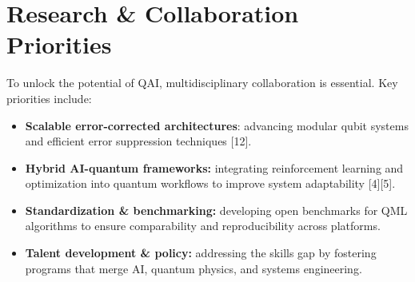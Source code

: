 \section{Research \& Collaboration Priorities}
\hspace*{0.3in}To unlock the potential of QAI, multidisciplinary collaboration is essential. Key priorities include:
\begin{itemize}
	\item \textbf{Scalable error-corrected architectures}: advancing modular qubit systems and efficient error suppression techniques [12].
	\item \textbf{Hybrid AI-quantum frameworks:} integrating reinforcement learning and optimization into quantum workflows to improve system adaptability [4][5].
	\item \textbf{Standardization \& benchmarking:} developing open benchmarks for QML algorithms to ensure comparability and reproducibility across platforms.
	\item \textbf{Talent development \& policy:} addressing the skills gap by fostering programs that merge AI, quantum physics, and systems engineering.
\end{itemize}